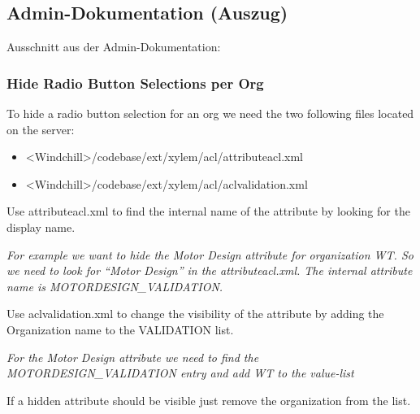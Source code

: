 \subsection{Admin-Dokumentation (Auszug)}
\label{app:AdminDokumentation}
Ausschnitt aus der Admin-Dokumentation:

\subsubsection*{Hide Radio Button Selections per Org}
To hide a radio button selection for an org we need the two following files located on the server:
\begin{itemize}
    \item <Windchill>/codebase/ext/xylem/acl/attributeacl.xml
    \item <Windchill>/codebase/ext/xylem/acl/aclvalidation.xml
\end{itemize}
Use attributeacl.xml to find the internal name of the attribute by looking for the display name.

\textit{For example we want to hide the Motor Design attribute for organization WT. So we need to look for “Motor Design” in the attributeacl.xml. The internal attribute name is MOTORDESIGN\_VALIDATION.}

Use aclvalidation.xml to change the visibility of the attribute by adding the Organization name to the VALIDATION list.

\textit{For the Motor Design attribute we need to find the MOTORDESIGN\_VALIDATION entry and add WT to the value-list}

If a hidden attribute should be visible just remove the organization from the list.

